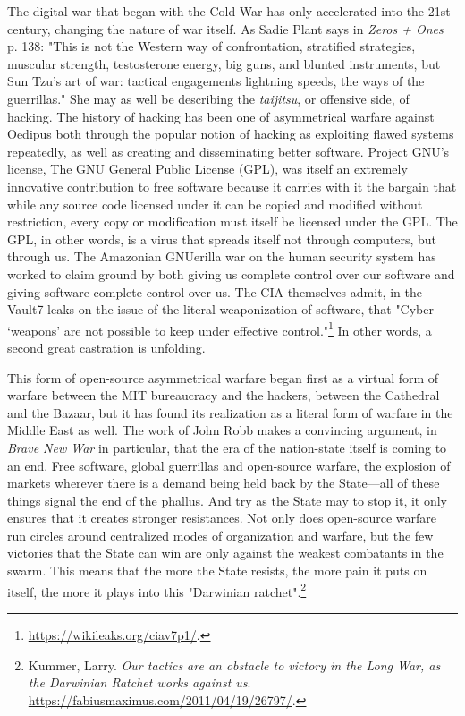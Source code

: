 \documentclass[10pt, statementpaper, twoside, openright]{memoir}
\begin{document}
The digital war that began with the Cold War has only accelerated into the 21st century, changing the nature of war itself. As Sadie Plant says in \textit{Zeros + Ones} p. 138: "This is not the Western way of confrontation, stratified strategies, muscular strength, testosterone energy, big guns, and blunted instruments, but Sun Tzu's art of war: tactical engagements lightning speeds, the ways of the guerrillas." She may as well be describing the \textit{taijitsu}, or offensive side, of hacking. The history of hacking has been one of asymmetrical warfare against Oedipus both through the popular notion of hacking as exploiting flawed systems repeatedly, as well as creating and disseminating better software. Project GNU's license, The GNU General Public License (GPL), was itself an extremely innovative contribution to free software because it carries with it the bargain that while any source code licensed under it can be copied and modified without restriction, every copy or modification must itself be licensed under the GPL. The GPL, in other words, is a virus that spreads itself not through computers, but through us. The Amazonian GNUerilla war on the human security system has worked to claim ground by both giving us complete control over our software and giving software complete control over us. The CIA themselves admit, in the Vault7 leaks on the issue of the literal weaponization of software, that "Cyber ‘weapons' are not possible to keep under effective control."\footnote{\href{https://wikileaks.org/ciav7p1/}{https://wikileaks.org/ciav7p1/}.} In other words, a second great castration is unfolding.

This form of open-source asymmetrical warfare began first as a virtual form of warfare between the MIT bureaucracy and the hackers, between the Cathedral and the Bazaar, but it has found its realization as a literal form of warfare in the Middle East as well. The work of John Robb makes a convincing argument, in \textit{Brave New War} in particular, that the era of the nation-state itself is coming to an end. Free software, global guerrillas and open-source warfare, the explosion of markets wherever there is a demand being held back by the State---all of these things signal the end of the phallus. And try as the State may to stop it, it only ensures that it creates stronger resistances. Not only does open-source warfare run circles around centralized modes of organization and warfare, but the few victories that the State can win are only against the weakest combatants in the swarm. This means that the more the State resists, the more pain it puts on itself, the more it plays into this "Darwinian ratchet".\footnote{Kummer, Larry. \textit{Our tactics are an obstacle to victory in the Long War, as the Darwinian Ratchet works against us}. \href{https://fabiusmaximus.com/2011/04/19/26797/}{https://fabiusmaximus.com/2011/04/19/26797/}.}
\end{document}
